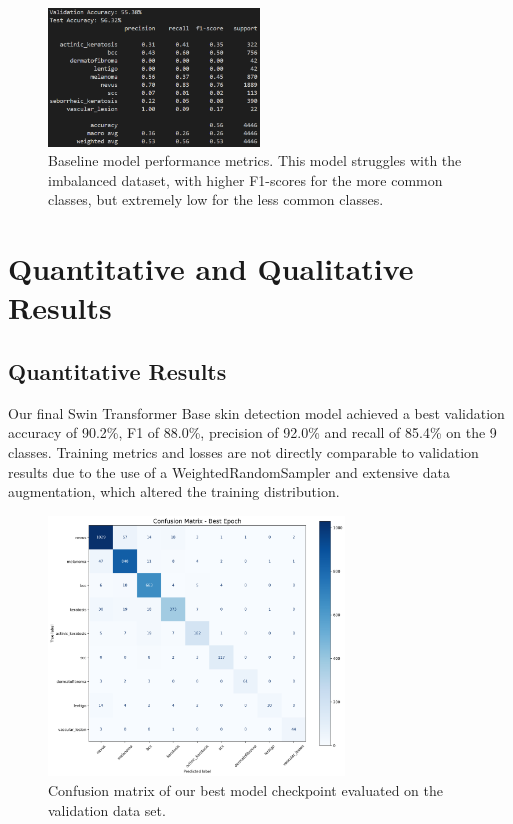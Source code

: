 \documentclass{article} %
\begin{document}
\begin{figure}[H]
\begin{center}
\includegraphics[width=0.5\textwidth]{Figs/baseline_results.png}
\end{center}
\caption{Baseline model performance metrics. This model struggles with the imbalanced dataset, with higher F1-scores for the more common classes, but extremely low for the less common classes.}
\end{figure}

\section{Quantitative and Qualitative Results}

\subsection{Quantitative Results}

Our final Swin Transformer Base skin detection model achieved a best validation accuracy of 90.2\%, F1 of 88.0\%, precision of 92.0\% and recall of 85.4\% on the 9 classes. Training metrics and losses are not directly comparable to validation results due to the use of a WeightedRandomSampler and extensive data augmentation, which altered the training distribution.

\begin{figure}[H]
\begin{center}
\includegraphics[width=0.7\textwidth]{Figs/confusion_matrix.png}
\end{center}
\caption{Confusion matrix of our best model checkpoint evaluated on the validation data set.}
\end{figure}
\end{document}
